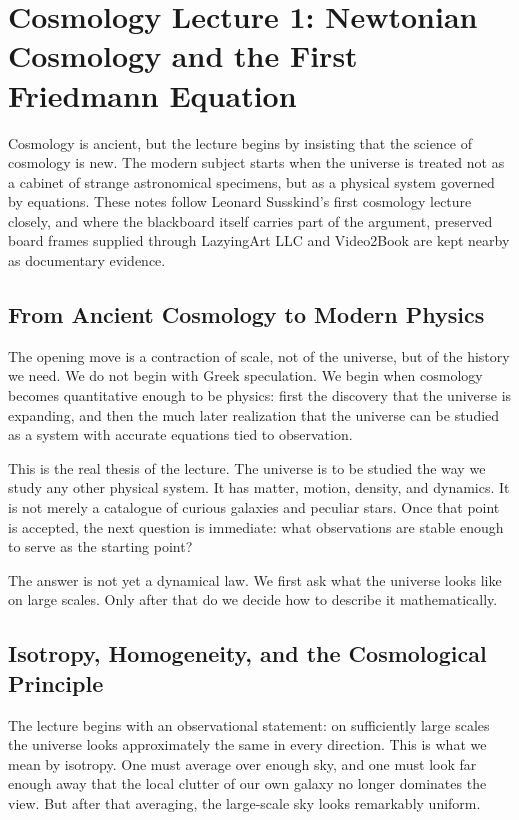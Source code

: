\chapter{Cosmology Lecture 1: Newtonian Cosmology and the First Friedmann Equation}

Cosmology is ancient, but the lecture begins by insisting that the science of cosmology is new. The modern subject starts when the universe is treated not as a cabinet of strange astronomical specimens, but as a physical system governed by equations. These notes follow Leonard Susskind's first cosmology lecture closely, and where the blackboard itself carries part of the argument, preserved board frames supplied through LazyingArt LLC and Video2Book are kept nearby as documentary evidence.

\section{From Ancient Cosmology to Modern Physics}

The opening move is a contraction of scale, not of the universe, but of the history we need. We do not begin with Greek speculation. We begin when cosmology becomes quantitative enough to be physics: first the discovery that the universe is expanding, and then the much later realization that the universe can be studied as a system with accurate equations tied to observation.

This is the real thesis of the lecture. The universe is to be studied the way we study any other physical system. It has matter, motion, density, and dynamics. It is not merely a catalogue of curious galaxies and peculiar stars. Once that point is accepted, the next question is immediate: what observations are stable enough to serve as the starting point?

The answer is not yet a dynamical law. We first ask what the universe looks like on large scales. Only after that do we decide how to describe it mathematically.

\section{Isotropy, Homogeneity, and the Cosmological Principle}

The lecture begins with an observational statement: on sufficiently large scales the universe looks approximately the same in every direction. This is what we mean by isotropy. One must average over enough sky, and one must look far enough away that the local clutter of our own galaxy no longer dominates the view. But after that averaging, the large-scale sky looks remarkably uniform.

